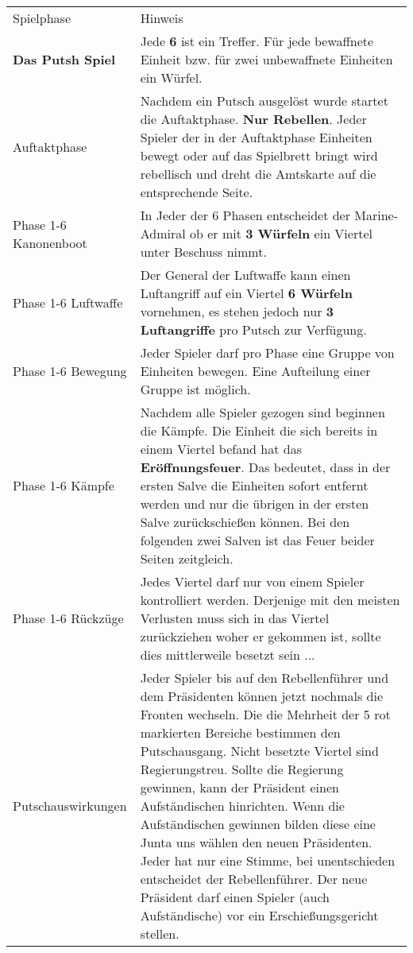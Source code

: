 \documentclass[5pt]{article}
\begin{document}
 \begin{tabular}{p{4cm}p{14.5cm}}
 	\toprule
	\addlinespace
    		Spielphase & Hinweis \\
	\addlinespace
    	
	\midrule
    	
	\textbf{Das Putsh Spiel }    		&	Jede \textbf{6} ist ein Treffer. Für jede bewaffnete Einheit  bzw. für zwei unbewaffnete Einheiten ein Würfel. \\
  	\addlinespace
     	
	Auftaktphase 				& 	Nachdem ein Putsch ausgelöst wurde startet die Auftaktphase. \textbf{Nur Rebellen}. Jeder Spieler der in der Auftaktphase Einheiten bewegt oder auf das Spielbrett bringt wird rebellisch und dreht die Amtskarte auf die entsprechende Seite.    \\

	Phase 1-6 Kanonenboot		& 	In Jeder der 6 Phasen entscheidet der Marine-Admiral ob er mit \textbf{3 Würfeln} ein Viertel unter Beschuss nimmt. \\
	
	Phase 1-6 Luftwaffe			& 	Der General der Luftwaffe kann einen Luftangriff auf ein Viertel \textbf{6 Würfeln} vornehmen, 
								es stehen jedoch nur \textbf{3 Luftangriffe} pro Putsch zur Verfügung.  \\
								
	Phase 1-6 Bewegung		&	Jeder Spieler darf pro Phase eine Gruppe von Einheiten bewegen. Eine Aufteilung einer Gruppe ist möglich. \\
	
	Phase 1-6 Kämpfe 			&	Nachdem alle Spieler gezogen sind beginnen die Kämpfe. Die Einheit die sich bereits in einem Viertel befand hat das \textbf{Eröffnungsfeuer}. Das bedeutet, dass in der ersten Salve die Einheiten sofort entfernt werden und nur die übrigen in der ersten Salve zurückschießen können. Bei den folgenden zwei Salven ist das Feuer beider Seiten zeitgleich.\\
	
	Phase 1-6 Rückzüge			&	Jedes Viertel darf nur von einem Spieler kontrolliert werden. Derjenige mit den meisten Verlusten muss sich in das Viertel zurückziehen woher er gekommen ist, sollte dies mittlerweile besetzt sein ... \\
	
	Putschauswirkungen			&	Jeder Spieler bis auf den Rebellenführer und dem Präsidenten können jetzt nochmals die Fronten wechseln. Die die Mehrheit der 5 rot markierten Bereiche bestimmen den Putschausgang. Nicht besetzte Viertel sind Regierungstreu.
								Sollte die Regierung gewinnen, kann der Präsident einen Aufständischen hinrichten. 
								Wenn die Aufständischen gewinnen bilden diese eine Junta uns wählen den neuen Präsidenten. Jeder hat nur eine Stimme, bei unentschieden entscheidet der Rebellenführer. 
								Der neue Präsident darf einen Spieler (auch Aufständische) vor ein Erschießungsgericht stellen.\\			
	


\end{tabular}
\end{document}
